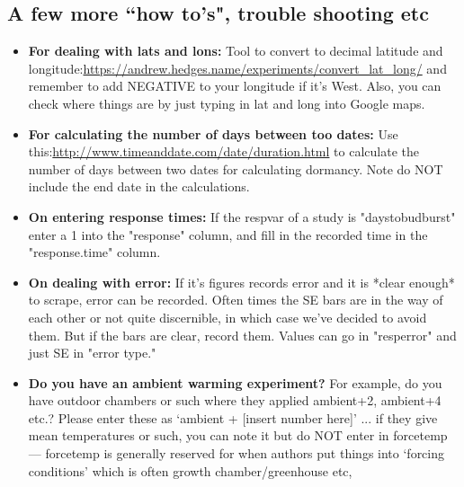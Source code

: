 \documentclass{article}[12pt]
\begin{document}
\subsection*{A few more ``how to's", trouble shooting etc} 
 \begin{itemize}
 \item \textbf{For dealing with lats and lons:} Tool to convert to decimal latitude and longitude:\url{https://andrew.hedges.name/experiments/convert_lat_long/}  and remember to add NEGATIVE to your longitude if it's West. Also, you can check where things are by just typing in lat and long into Google maps.
\item \textbf{ For calculating the number of days between too dates:} Use this:\url{http://www.timeanddate.com/date/duration.html} to calculate the number of days between two dates for calculating dormancy. Note do NOT include the end date in the calculations.
\item \textbf{On entering response times:} If the respvar of a study is "daystobudburst" enter a 1 into the "response" column, and fill in the recorded time in the "response.time" column.
\item \textbf{On dealing with error:} If it's figures records error and it is *clear enough* to scrape, error can be recorded. Often times the SE bars are in the way of each other or not quite discernible, in which case we've decided to avoid them. But if the bars are clear, record them. Values can go in "resp\textundersccore error" and just SE in "error type."
\item {\bf Do you have an ambient warming experiment?} For example, do you have outdoor chambers or such where they applied ambient+2, ambient+4 etc.? Please enter these as `ambient + [insert number here]'  ... if they give mean temperatures or such, you can note it but do NOT enter in forcetemp --- forcetemp is generally reserved for when authors put things into `forcing conditions' which is often growth chamber/greenhouse etc,
\end{itemize}
\end{document}
